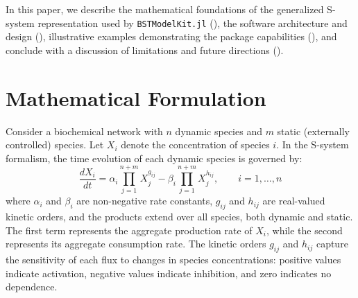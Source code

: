 \documentclass[11pt]{article}
\begin{document}
In this paper, we describe the mathematical foundations of the generalized S-system representation used by \texttt{BSTModelKit.jl} (), the software architecture and design (), illustrative examples demonstrating the package capabilities (), and conclude with a discussion of limitations and future directions ().

\section{Mathematical Formulation}\label{sec:formulation}
Consider a biochemical network with $n$ dynamic species and $m$ static (externally controlled) species. Let $X_i$ denote the concentration of species $i$. In the S-system formalism, the time evolution of each dynamic species is governed by:
\begin{equation}\label{eq:ssystem}
    \frac{dX_i}{dt} = \alpha_i \prod_{j=1}^{n+m} X_j^{g_{ij}} - \beta_i \prod_{j=1}^{n+m} X_j^{h_{ij}}, \qquad i = 1, \dots, n
\end{equation}
where $\alpha_i$ and $\beta_i$ are non-negative rate constants, $g_{ij}$ and $h_{ij}$ are real-valued kinetic orders, and the products extend over all species, both dynamic and static. The first term represents the aggregate production rate of $X_i$, while the second represents its aggregate consumption rate. The kinetic orders $g_{ij}$ and $h_{ij}$ capture the sensitivity of each flux to changes in species concentrations: positive values indicate activation, negative values indicate inhibition, and zero indicates no dependence.
\end{document}
